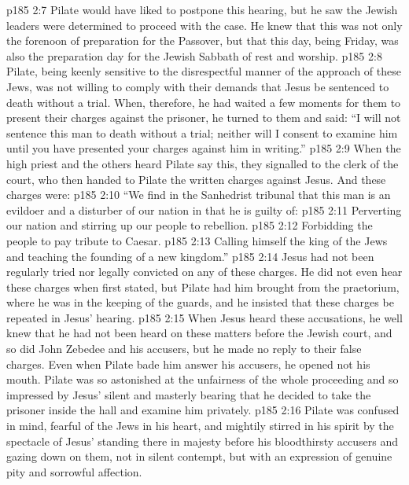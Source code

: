 \vs p185 2:7 \pc Pilate would have liked to postpone this hearing, but he saw the Jewish leaders were determined to proceed with the case. He knew that this was not only the forenoon of preparation for the Passover, but that this day, being Friday, was also the preparation day for the Jewish Sabbath of rest and worship.
\vs p185 2:8 Pilate, being keenly sensitive to the disrespectful manner of the approach of these Jews, was not willing to comply with their demands that Jesus be sentenced to death without a trial. When, therefore, he had waited a few moments for them to present their charges against the prisoner, he turned to them and said: “I will not sentence this man to death without a trial; neither will I consent to examine him until you have presented your charges against him in writing.”
\vs p185 2:9 When the high priest and the others heard Pilate say this, they signalled to the clerk of the court, who then handed to Pilate the written charges against Jesus. And these charges were:
\vs p185 2:10 \pc “We find in the Sanhedrist tribunal that this man is an evildoer and a disturber of our nation in that he is guilty of:
\vs p185 2:11 \bibnobreakspace Perverting our nation and stirring up our people to rebellion.
\vs p185 2:12 \bibnobreakspace Forbidding the people to pay tribute to Caesar.
\vs p185 2:13 \bibnobreakspace Calling himself the king of the Jews and teaching the founding of a new kingdom.”
\vs p185 2:14 \pc Jesus had not been regularly tried nor legally convicted on any of these charges. He did not even hear these charges when first stated, but Pilate had him brought from the praetorium, where he was in the keeping of the guards, and he insisted that these charges be repeated in Jesus’ hearing.
\vs p185 2:15 When Jesus heard these accusations, he well knew that he had not been heard on these matters before the Jewish court, and so did John Zebedee and his accusers, but he made no reply to their false charges. Even when Pilate bade him answer his accusers, he opened not his mouth. Pilate was so astonished at the unfairness of the whole proceeding and so impressed by Jesus’ silent and masterly bearing that he decided to take the prisoner inside the hall and examine him privately.
\vs p185 2:16 Pilate was confused in mind, fearful of the Jews in his heart, and mightily stirred in his spirit by the spectacle of Jesus’ standing there in majesty before his bloodthirsty accusers and gazing down on them, not in silent contempt, but with an expression of genuine pity and sorrowful affection.
